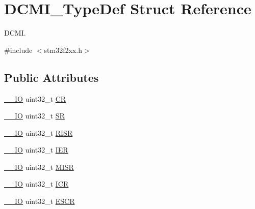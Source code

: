 \hypertarget{struct_d_c_m_i___type_def}{\section{D\-C\-M\-I\-\_\-\-Type\-Def Struct Reference}
\label{struct_d_c_m_i___type_def}
}


D\-C\-M\-I.  




{\ttfamily \#include $<$stm32f2xx.\-h$>$}

\subsection*{Public Attributes}
\begin{DoxyCompactItemize}
\item 
\hyperlink{group___c_m_s_i_s__core__definitions_gaec43007d9998a0a0e01faede4133d6be}{\-\_\-\-\_\-\-I\-O} uint32\-\_\-t \hyperlink{struct_d_c_m_i___type_def_a3cfcc9860ca551cbcb10c1c3dd4304f0}{C\-R}
\item 
\hyperlink{group___c_m_s_i_s__core__definitions_gaec43007d9998a0a0e01faede4133d6be}{\-\_\-\-\_\-\-I\-O} uint32\-\_\-t \hyperlink{struct_d_c_m_i___type_def_a1bbe4b3cc5d9552526bec462b42164d5}{S\-R}
\item 
\hyperlink{group___c_m_s_i_s__core__definitions_gaec43007d9998a0a0e01faede4133d6be}{\-\_\-\-\_\-\-I\-O} uint32\-\_\-t \hyperlink{struct_d_c_m_i___type_def_ae0aba9f38498cccbe0186b7813825026}{R\-I\-S\-R}
\item 
\hyperlink{group___c_m_s_i_s__core__definitions_gaec43007d9998a0a0e01faede4133d6be}{\-\_\-\-\_\-\-I\-O} uint32\-\_\-t \hyperlink{struct_d_c_m_i___type_def_a91ce93b57d8382147574c678ee497c63}{I\-E\-R}
\item 
\hyperlink{group___c_m_s_i_s__core__definitions_gaec43007d9998a0a0e01faede4133d6be}{\-\_\-\-\_\-\-I\-O} uint32\-\_\-t \hyperlink{struct_d_c_m_i___type_def_ab367c4ca2e8ac87238692e6d55d622ec}{M\-I\-S\-R}
\item 
\hyperlink{group___c_m_s_i_s__core__definitions_gaec43007d9998a0a0e01faede4133d6be}{\-\_\-\-\_\-\-I\-O} uint32\-\_\-t \hyperlink{struct_d_c_m_i___type_def_a0371fc07916e3043e1151eaa97e172c9}{I\-C\-R}
\item 
\hyperlink{group___c_m_s_i_s__core__definitions_gaec43007d9998a0a0e01faede4133d6be}{\-\_\-\-\_\-\-I\-O} uint32\-\_\-t \hyperlink{struct_d_c_m_i___type_def_a52c16b920a3f25fda961d0cd29749433}{E\-S\-C\-R}
\item 

\end{DoxyCompactItemize}
